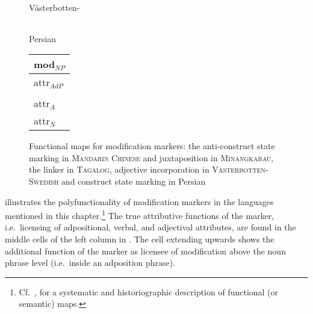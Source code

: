 \begin{figure}
{\begin{center}{\sc Västerbotten-}
\begin{tabular}{| l |}
\hline
\end{tabular}
\end{center}
}
\parbox[b]{0.20\textwidth}{
\begin{center}{\sc Persian}\\
\bigskip
\begin{tabular}{| l |}
\hline
{\sc mod}$_{NP}$\\
\hline
\hline
{\sc attr}$_{AdP}$\\
\hline
\\
\hline
{\sc attr}$_{A}$\\
\hline
{\sc attr}$_{N}$\\
\hline
\end{tabular}
\end{center}
}
\caption[Functional map for modification marking]{Functional maps for modification markers: the anti-construct state marking in \textsc{Mandarin Chinese} and juxtaposition in \textsc{Minangkabau}, the linker in \textsc{Tagalog}, adjective incorporation in \textsc{Västerbotten-Swedish} and construct state marking in {\sc Persian}}
\end{figure}
 illustrates the polyfunctionality of modification markers in the languages mentioned in this chapter.\footnote{Cf.~\cite{haspelmath2003}, for a systematic and historiographic description of functional (or semantic) maps.} The true attributive functions of the marker, i.e.~licensing of adpositional, verbal, and adjectival attributes, are found in the middle cells of the left column in . The cell extending upwards shows the additional function of the marker as licensee of modification above the noun phrase level (i.e.~inside an adposition phrase).%


